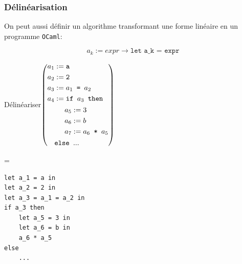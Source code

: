 \begin{frame}[fragile,t]
    \frametitle{Délinéarisation}

    On peut aussi définir un algorithme transformant une forme linéaire en un
    programme \texttt{OCaml}:

    $$a_k := expr \longrightarrow \texttt{let a\_k = expr}$$

    \vspace{0.5cm}
    \pause

    \begin{minipage}{0.5\textwidth}
        Délinéariser\small$\left(\begin{aligned}
                    a_1 & := \texttt{a}                                \\
                    a_2 & := \texttt{2}                                \\
                    a_3 & := a_1 \texttt{ = } a_2                      \\
                    a_4 & := \texttt{if } a_3 \texttt{ then}           \\
                        & \hspace{0.5cm} \begin{aligned}
                                             a_5 & := 3                    \\
                                             a_6 & := b                    \\
                                             a_7 & := a_6 \texttt{ * } a_5
                                         \end{aligned} \\
                        & \texttt{else } ...
                \end{aligned}\right)$
    \end{minipage}=%
    \begin{minipage}{0.45\textwidth}
        \small \begin{verbatim}
let a_1 = a in
let a_2 = 2 in
let a_3 = a_1 = a_2 in
if a_3 then
    let a_5 = 3 in
    let a_6 = b in
    a_6 * a_5
else
    ...
            \end{verbatim}
    \end{minipage}
\end{frame}

